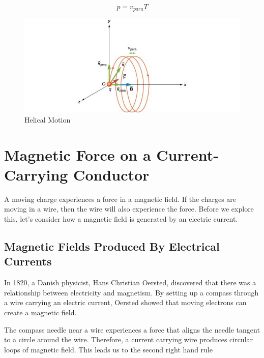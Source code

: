 \documentclass[14pt]{memoir}
\begin{document}
\begin{equation}
p = v_{para} T
\end{equation}

\begin{figure}[H]
\begin{center}
\includegraphics[scale=0.80]{fig/fig_11_08.jpg}
\caption{Helical Motion}
\label{fig:11_08}
\end{center}
\end{figure}

\section{Magnetic Force on a Current-Carrying Conductor}

A moving charge experiences a force in a magnetic field. If the charges are moving in a wire, then the wire will also experience the force. Before we explore this, let's consider how a magnetic field is generated by an electric current. 

\subsection{Magnetic Fields Produced By Electrical Currents}

In 1820, a Danish physicist, Hans Christian Oersted, discovered that there was a relationship between electricity and magnetism. By setting up a compass through a wire carrying an electric current, Oersted showed that moving electrons can create a magnetic field.

The compass needle near a wire experiences a force that aligns the needle tangent to a circle around the wire. Therefore, a current carrying wire produces circular loops of magnetic field. This leads us to the second right hand rule
\end{document}
